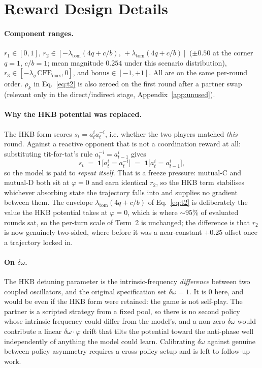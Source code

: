 \documentclass{article}
\begin{document}
\section{Reward Design Details}
\label{app:reward_details}

\paragraph{Component ranges.} $r_1 \in [0,1]$, $r_2 \in
[-\lambda_{\text{tom}}(4q + c/b),\, +\lambda_{\text{tom}}(4q + c/b)]$
($\pm 0.50$ at the corner $q\!=\!1$, $c/b\!=\!1$; mean magnitude $0.254$ under
this scenario distribution), $r_3 \in [-\lambda_g\,\mathrm{CFE}_{\max}, 0]$,
and $\mathrm{bonus} \in [-1,+1]$. All are on the same per-round order.
$\rho_k$ in Eq.~\ref{eq:t2} is also zeroed on the first round after a partner
swap (relevant only in the direct/indirect stage,
Appendix~\ref{app:unused}).

\paragraph{Why the HKB potential was replaced.} The HKB form scores
$s_t = a_t^{i} a_t^{-i}$, i.e. whether the two players matched \emph{this}
round. Against a reactive opponent that is not a coordination reward at all:
substituting tit-for-tat's rule $a_t^{-i} = a_{t-1}^{i}$ gives
\[
s_t \;=\; \mathbf{1}\bigl[a_t^{i} = a_t^{-i}\bigr]
      \;=\; \mathbf{1}\bigl[a_t^{i} = a_{t-1}^{i}\bigr],
\]
so the model is paid to \emph{repeat itself}. That is a freeze pressure:
mutual-C and mutual-D both sit at $\varphi = 0$ and earn identical $r_2$, so
the HKB term stabilises whichever absorbing state the trajectory falls into
and supplies no gradient between them. The envelope
$\lambda_{\text{tom}}(4q + c/b)$ of Eq.~\ref{eq:t2} is deliberately the value
the HKB potential takes at $\varphi = 0$, which is where ${\sim}95\%$ of
evaluated rounds sat, so the per-turn scale of Term~2 is unchanged; the
difference is that $r_2$ is now genuinely two-sided, where before it was a
near-constant $+0.25$ offset once a trajectory locked in.

\paragraph{On $\delta\omega$.} The HKB detuning parameter is the
intrinsic-frequency \emph{difference} between two coupled oscillators, and the
original specification set $\delta\omega = 1$. It is $0$ here, and would be
even if the HKB form were retained: the game is not self-play. The partner is
a scripted strategy from a fixed pool, so there is no second policy whose
intrinsic frequency could differ from the model's, and a non-zero
$\delta\omega$ would contribute a linear $\delta\omega\!\cdot\!\varphi$ drift
that tilts the potential toward the anti-phase well independently of anything
the model could learn. Calibrating $\delta\omega$ against genuine
between-policy asymmetry requires a cross-policy setup and is left to
follow-up work.
\end{document}
